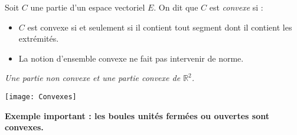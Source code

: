 \documentclass[a4paper,10pt]{report}
\begin{document}
\begin{Definition}{} Soit $C$ une partie d'un espace vectoriel $E$. On dit que $C$ est \emph{convexe} si :

\vspace{1cm}

\end{Definition}

\begin{Remarques}{}
\begin{itemize} 
\item $C$ est convexe si et seulement si il contient tout segment dont il contient les extrémités.
\item La notion d'ensemble convexe ne fait pas intervenir de norme.
\end{itemize}
\end{Remarques}{}

\begin{center}
\emph{Une partie non convexe et une partie convexe de $\mathbb{R}^2$.}
\end{center}

\begin{center}
\texttt{[image: Convexes]}
\end{center}

\textbf{Exemple important : les boules unités fermées ou ouvertes sont convexes.}


\vspace{6cm}
%
\end{document}

